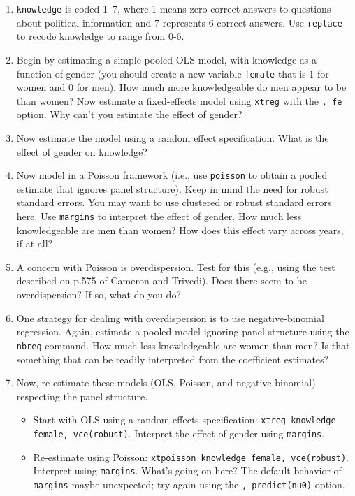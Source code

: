 \documentclass[a4paper,12pt]{article}
\begin{document}
\begin{enumerate}
\item \texttt{knowledge} is coded 1--7, where 1 means zero correct answers to questions about political information and 7 represents 6 correct answers. Use \texttt{replace} to recode knowledge to range from 0-6.

\item Begin by estimating a simple pooled OLS model, with knowledge as a function of gender (you should create a new variable \texttt{female} that is 1 for women and 0 for men). How much more knowledgeable do men appear to be than women? Now estimate a fixed-effects model using \texttt{xtreg} with the \texttt{, fe} option. Why can't you estimate the effect of gender?

\item Now estimate the model using a random effect specification. What is the effect of gender on knowledge?

\item Now model in a Poisson framework (i.e., use \texttt{poisson} to obtain a pooled estimate that ignores panel structure). Keep in mind the need for robust standard errors. You may want to use clustered or robust standard errors here. Use \texttt{margins} to interpret the effect of gender. How much less knowledgeable are men than women? How does this effect vary across years, if at all?

\item A concern with Poisson is overdispersion. Test for this (e.g., using the test described on p.575 of Cameron and Trivedi). Does there seem to be overdispersion? If so, what do you do?

\item One strategy for dealing with overdispersion is to use negative-binomial regression. Again, estimate a pooled model ignoring panel structure using the \texttt{nbreg} command. How much less knowledgeable are women than men? Is that something that can be readily interpreted from the coefficient estimates?

\item Now, re-estimate these models (OLS, Poisson, and negative-binomial) respecting the panel structure. 

    \begin{itemize}
    \item Start with OLS using a random effects specification: \texttt{xtreg knowledge female, vce(robust)}. Interpret the effect of gender using \texttt{margins}.
    
    \item Re-estimate using Poisson: \texttt{xtpoisson knowledge female, vce(robust)}. Interpret using \texttt{margins}. What's going on here? The default behavior of \texttt{margins} maybe unexpected; try again using the \texttt{, predict(nu0)} option.
    

\end{itemize}
\end{enumerate}
\end{document}
